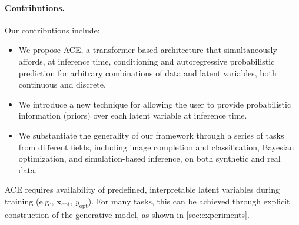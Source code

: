 \documentclass[twoside]{article}
\newcommand{\x}{\mathbf{x}}
\newcommand{\xopt}{\x_\text{opt}}
\newcommand{\yopt}{y_\text{opt}}
\begin{document}
\paragraph{Contributions.} Our contributions include: 
\begin{itemize}[nosep]
\item We propose ACE, a transformer-based architecture that simultaneously affords, at inference time, conditioning and autoregressive probabilistic prediction for arbitrary combinations of data and latent variables, both continuous and discrete.
\item We introduce a new technique for allowing the user to provide probabilistic information (priors) over each latent variable at inference time. %
\item We substantiate the generality of our framework through a series of tasks from different fields, including image completion and classification, Bayesian optimization, and simulation-based inference, on both synthetic and real data.
\end{itemize}

\begin{tcolorbox}[colback=red!5!white,colframe=red!75!black]
ACE requires availability of predefined, interpretable latent variables during training (e.g., $\xopt$, $\yopt$). For many tasks, this can be achieved through explicit construction of the generative model, as shown in \cref{sec:experiments}.
\end{tcolorbox}

\end{document}

